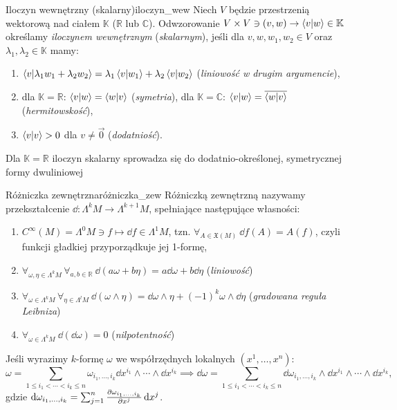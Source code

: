 \documentclass{article}
\newcommand\R{\mathbb{R}}
\newcommand\sunj{\sum_{j=1}^{n}}
\begin{document}
\begin{dfn}{Iloczyn wewnętrzny (skalarny)}{iloczyn_wew}
  Niech $V$ będzie przestrzenią wektorową nad ciałem $\mathbb{K}$ ($\R$ lub $\mathbb{C}$). Odwzorowanie $V\times V\ni(v,w)\to\braket{v}{w}\in\mathbb{K}$ określamy \textit{iloczynem wewnętrznym} (\textit{skalarnym}), jeśli dla $v, w, w_1, w_2\in V$ oraz $\lambda_1, \lambda_2\in\mathbb{K}$ mamy:
  \begin{enumerate}
    \item $\braket{v}{\lambda_1 w_1 + \lambda_2 w_2} = \lambda_1\braket{v}{w_1} + \lambda_2\braket{v}{w_2}$ (\textit{liniowość w drugim argumencie}),
    \item dla $\mathbb{K}=\R$:  $\braket{v}{w}=\braket{w}{v}$ (\textit{symetria}),
          dla $\mathbb{K}=\mathbb{C}$: $\braket{v}{w}=\overline{\braket{w}{v}}$ (\textit{hermitowskość}),
    \item $\braket{v}{v}>0$ dla $v\neq\vec{0}$ (\textit{dodatniość}).
  \end{enumerate}
  Dla $\mathbb{K}=\R$ iloczyn skalarny sprowadza się do dodatnio-określonej, symetrycznej formy dwuliniowej 
\end{dfn}


\begin{dfn}{Różniczka zewnętrzna}{różniczka_zew}
  Różniczką zewnętrzną nazywamy przekształcenie $\dd:\Lambda^kM\to\Lambda^{k+1}M$, spełniające następujące własności:
  \begin{enumerate}
    \item $C^{\infty}(M)=\Lambda^0M\ni f\mapsto\dd{f}\in \Lambda^1M$, tzn. $\forall_{A\in\mathfrak{X}(M)}\  \dd{f}(A)=A(f)$, czyli funkcji gładkiej przyporządkuje jej 1-formę,
    \item $\forall_{\omega,\eta\in\Lambda^kM}\,\forall_{a,b\in\R}\ \dd{(a\omega + b\eta)}=a\dd{\omega}+b\dd{\eta}$ (\textit{liniowość})
    \item $\forall_{\omega\in\Lambda^kM}\,\forall_{\eta\in\Lambda^lM}\ \dd{(\omega\wedge\eta)}=\dd{\omega}\wedge\eta + (-1)^k\omega\wedge\dd{\eta}$ (\textit{gradowana reguła Leibniza})
    \item $\forall_{\omega\in\Lambda^kM}\ \dd{(\dd{\omega})}=0$ (\textit{nilpotentność})
  \end{enumerate}
  Jeśli wyrazimy $k$-formę $\omega$ we współrzędnych lokalnych $(x^1,\ldots,x^n)$:
  \[
    \omega = \sum_{1\leq i_1 < \cdots < i_k \leq n} \omega_{i_1,\ldots, i_k}\dd{x}^{i_1}\wedge\cdots\wedge\dd{x}^{i_k}\implies\dd{\omega}=\sum_{1\leq i_1 < \cdots < i_k \leq n} \dd{\omega_{i_1,\ldots, i_k}}\wedge\dd{x}^{i_1}\wedge\cdots\wedge\dd{x}^{i_k},
  \]
  gdzie $\dd{\omega_{i_1,\ldots, i_k}}=\sunj\pdv{\omega_{i_1,\ldots, i_k}}{x^j}\dd{x^j}$.
\end{dfn}
\end{document}
